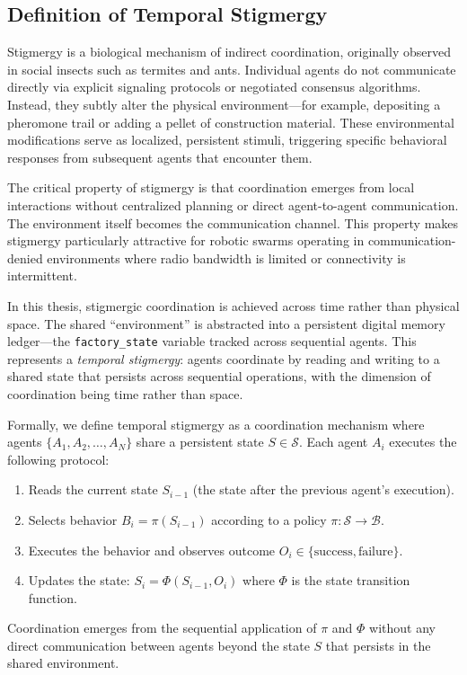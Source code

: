 \documentclass[12pt,a4paper,oneside]{report}
\begin{document}
\subsection{Definition of Temporal Stigmergy}

Stigmergy is a biological mechanism of indirect coordination, originally observed in social insects such as termites and ants. Individual agents do not communicate directly via explicit signaling protocols or negotiated consensus algorithms. Instead, they subtly alter the physical environment---for example, depositing a pheromone trail or adding a pellet of construction material. These environmental modifications serve as localized, persistent stimuli, triggering specific behavioral responses from subsequent agents that encounter them.

The critical property of stigmergy is that coordination emerges from local interactions without centralized planning or direct agent-to-agent communication. The environment itself becomes the communication channel. This property makes stigmergy particularly attractive for robotic swarms operating in communication-denied environments where radio bandwidth is limited or connectivity is intermittent.

In this thesis, stigmergic coordination is achieved across time rather than physical space. The shared ``environment'' is abstracted into a persistent digital memory ledger---the \texttt{factory\_state} variable tracked across sequential agents. This represents a \textit{temporal stigmergy}: agents coordinate by reading and writing to a shared state that persists across sequential operations, with the dimension of coordination being time rather than space.

Formally, we define temporal stigmergy as a coordination mechanism where agents $\{A_1, A_2, \ldots, A_N\}$ share a persistent state $S \in \mathcal{S}$. Each agent $A_i$ executes the following protocol:
\begin{enumerate}
    \item Reads the current state $S_{i-1}$ (the state after the previous agent's execution).
    \item Selects behavior $B_i = \pi(S_{i-1})$ according to a policy $\pi: \mathcal{S} \rightarrow \mathcal{B}$.
    \item Executes the behavior and observes outcome $O_i \in \{\text{success}, \text{failure}\}$.
    \item Updates the state: $S_i = \Phi(S_{i-1}, O_i)$ where $\Phi$ is the state transition function.
\end{enumerate}
Coordination emerges from the sequential application of $\pi$ and $\Phi$ without any direct communication between agents beyond the state $S$ that persists in the shared environment.
\end{document}
